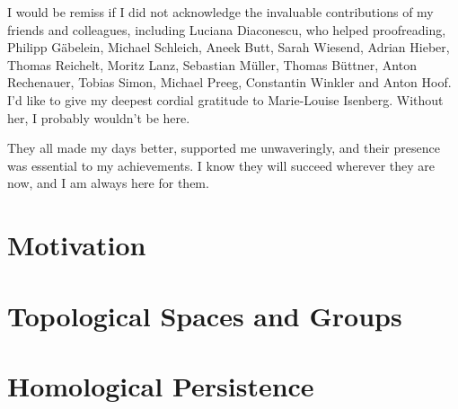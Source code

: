 \documentclass[b5paper, 11pt, twoside]{report}
\numberwithin{conj}{section}
\begin{document}
I would be remiss if I did not acknowledge the invaluable contributions of my friends and colleagues, including Luciana Diaconescu, who helped proofreading, Philipp Gäbelein, Michael Schleich, Aneek Butt, Sarah Wiesend, Adrian Hieber, Thomas Reichelt, Moritz Lanz, Sebastian Müller, Thomas Büttner, Anton Rechenauer, Tobias Simon, Michael Preeg, Constantin Winkler and Anton Hoof. I'd like to give my deepest cordial gratitude to Marie-Louise Isenberg. Without her, I probably wouldn't be here.

They all made my days better, supported me unwaveringly, and their presence was essential to my achievements. I know they will succeed wherever they are now, and I am always here for them.

\newpage
\tableofcontents

\singlespacing
\chapter{Motivation}


\chapter{Topological Spaces and Groups}


\chapter{Homological Persistence}


\singlespacing
\printbibliography

\newpage
\printindex
\end{document}
